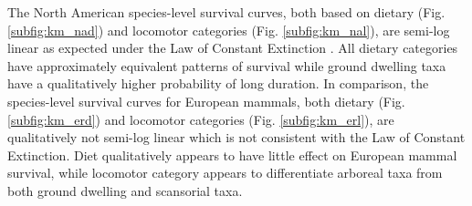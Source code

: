 \documentclass[12pt,letterpaper]{article}
\begin{document}
The North American species-level survival curves, both based on dietary (Fig. \ref{subfig:km_nad}) and locomotor categories (Fig. \ref{subfig:km_nal}), are semi-log linear as expected under the Law of Constant Extinction \citep{VanValen1973}. All dietary categories have approximately equivalent patterns of survival while ground dwelling taxa have a qualitatively higher probability of long duration. In comparison, the species-level survival curves for European mammals, both dietary (Fig. \ref{subfig:km_erd}) and locomotor categories (Fig. \ref{subfig:km_erl}), are qualitatively not semi-log linear which is not consistent with the Law of Constant Extinction. Diet qualitatively appears to have little effect on European mammal survival, while locomotor category appears to differentiate arboreal taxa from both ground dwelling and scansorial taxa.
\end{document}

